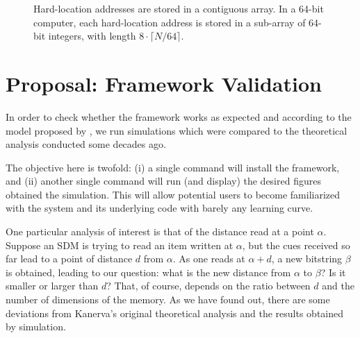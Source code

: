 \begin{figure}
\centering
{}

\caption{Hard-location addresses are stored in a contiguous array. In a 64-bit computer, each hard-location address is stored in a sub-array of 64-bit integers, with length $8 \cdot \lceil N/64 \rceil$.\label{tab:hl-addresses-detail}}
\end{figure}

\section{Proposal:  Framework Validation}

In order to check whether the framework works as expected and according to the model proposed by \citep{Kanerva1988}, we run simulations which were compared to the theoretical analysis conducted some decades ago.

The objective here is twofold: (i) a single command will install the framework, and (ii) another single command will run (and display) the desired figures obtained the simulation. This will allow potential users to become familiarized with the system and its underlying code with barely any learning curve. 

One particular analysis of interest is that of the distance read at a point $\alpha$. Suppose an SDM is trying to read an item written at $\alpha$, but the cues received so far lead to a point of distance $d$ from $\alpha$.  As one reads at $\alpha+d$, a new bitstring $\beta$ is obtained, leading to our question: what is the new distance from $\alpha$ to $\beta$? Is it smaller or larger than $d$? That, of course, depends on the ratio between $d$ and the number of dimensions of the memory.  As we have found out, there are some deviations from Kanerva's original theoretical analysis and the results obtained by simulation.

